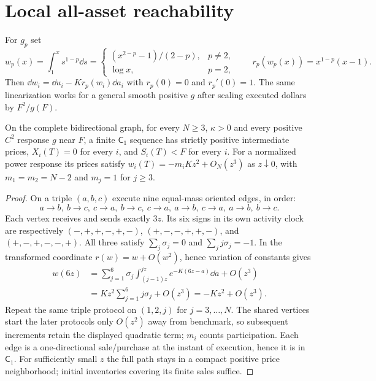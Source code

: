 \documentclass[review,hidelinks,onefignum,onetabnum]{siamonline250211}%
\begin{document}
\section{Local all-asset reachability}\label{sec:local}
For $g_p$ set
\begin{equation}\label{eq:w}
 w_p(x)=\int_1^x s^{1-p}\dd s
 =\begin{cases}(x^{2-p}-1)/(2-p),&p\ne2,\\ \log x,&p=2,\end{cases}
 \qquad r_p(w_p(x))=x^{1-p}(x-1).
\end{equation}
Then $\dd w_i=\dd u_i-Kr_p(w_i)\dd a_i$ with
$r_p(0)=0$ and $r_p'(0)=1$. The same linearization works for a general
smooth positive $g$ after scaling executed dollars by $F^2/g(F)$.

\begin{theorem}\label{thm:triangle}
On the complete bidirectional graph, for every $N\ge3$, $\kappa>0$
and every positive $C^2$ response $g$ near $F$, a finite $\mathsf C_1$
sequence has strictly positive intermediate prices,
$X_i(T)=0$ for every $i$, and $S_i(T)<F$ for every $i$.
For a normalized power response its prices satisfy
$w_i(T)=-m_iKz^2+O_N(z^3)$ as $z\downarrow0$, with
$m_1=m_2=N-2$ and $m_j=1$ for $j\ge3$.
\end{theorem}
\begin{proof}
On a triple $(a,b,c)$ execute nine equal-mass oriented edges, in order:
\[
 a\to b,\ b\to c,\ c\to a,\ b\to c,\ c\to a,\ a\to b,\ c\to a,\ a\to b,\ b\to c.
\]
Each vertex receives and sends exactly $3z$. Its six signs in its own
activity clock are respectively
$(-,+,+,-,+,-)$, $(+,-,-,+,+,-)$, and $(+,-,+,-,-,+)$.
All three satisfy $\sum_j\sigma_j=0$ and $\sum_jj\sigma_j=-1$.
In the transformed coordinate $r(w)=w+O(w^2)$, hence variation of
constants gives
\begin{align*}
 w(6z)&=\sum_{j=1}^6\sigma_j
 \int_{(j-1)z}^{jz}e^{-K(6z-a)}\dd a+O(z^3)\\
 &=Kz^2\sum_{j=1}^6j\sigma_j+O(z^3)=-Kz^2+O(z^3).
\end{align*}
Repeat the same triple protocol on $(1,2,j)$ for $j=3,\ldots,N$.
The shared vertices start the later protocols only $O(z^2)$ away from
benchmark, so subsequent increments retain the displayed quadratic
term; $m_i$ counts participation. Each edge is a one-directional sale/purchase
at the instant of execution, hence it is in $\mathsf C_1$. For sufficiently
small $z$ the full path stays in a compact positive price neighborhood;
initial inventories covering its finite sales suffice.
\end{proof}
\end{document}
